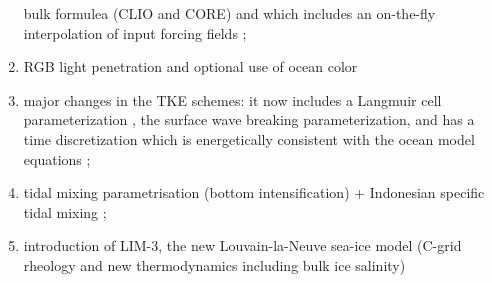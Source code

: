 \documentclass[../tex_main/NEMO_manual]{subfiles}
\begin{document}
\begin{enumerate}
bulk formulea (CLIO and CORE) and which includes an on-the-fly interpolation of input forcing fields ;
\item RGB light penetration and optional use of ocean color 
\item major changes in the TKE schemes: it now includes a Langmuir cell parameterization  \citep{Axell_JGR02}, 
the \citet{Mellor_Blumberg_JPO04} surface wave breaking parameterization, and has a time discretization 
which is energetically consistent with the ocean model equations \citep{Burchard_OM02, Marsaleix_al_OM08}; 
\item tidal mixing parametrisation (bottom intensification) + Indonesian specific tidal mixing \citep{Koch-Larrouy_al_GRL07}; 
\item introduction of LIM-3, the new Louvain-la-Neuve sea-ice model (C-grid rheology and
new thermodynamics including bulk ice salinity) \citep{Vancoppenolle_al_OM09a, Vancoppenolle_al_OM09b}
\end{enumerate}
\end{document}
